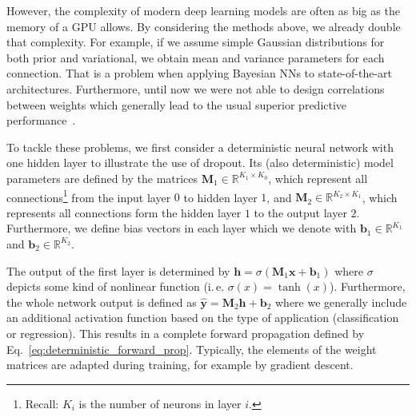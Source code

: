 \documentclass[runningheads]{llncs}
\begin{document}
However, the complexity of modern deep learning models are often as big as the memory of a GPU allows.
By considering the methods above, we already double that complexity.
For example, if we assume simple Gaussian distributions for both prior and variational, we obtain mean and variance parameters for each connection.
That is a problem when applying Bayesian NNs to state-of-the-art architectures.
Furthermore, until now we were not able to design correlations between weights which generally lead to the usual superior predictive performance~\cite{krizhevsky2012imagenet}.


To tackle these problems, we first consider a deterministic neural network with one hidden layer to illustrate the use of dropout.
Its (also deterministic) model parameters are defined by the matrices $\mathbf{M}_1 \in \mathbb{R}^{K_1\times K_0}$, which represent all connections\footnote{Recall: $K_i$ is the number of neurons in layer $i$.} from the input layer $0$ to hidden layer  $1$, and $\mathbf{M}_2 \in \mathbb{R}^{K_2\times K_1}$, which represents all connections form the hidden layer $1$ to the output layer $2$.
Furthermore, we define bias vectors in each layer which we denote with $\mathbf{b}_1 \in \mathbb{R}^{K_1}$ and $\mathbf{b}_2\in \mathbb{R}^{K_2}$.

The output of the first layer is determined by $\mathbf{h} = \sigma \left(\mathbf{M}_1\mathbf{x} + \mathbf{b}_1\right)$ where $\sigma$ depicts some kind of nonlinear function (i.\,e. $\sigma(x) = \tanh(x)$).
Furthermore, the whole network output is defined as $\hat{\mathbf{y}} = \mathbf{M}_2\mathbf{h} + \mathbf{b}_2$ where we generally include an additional activation function based on the type of application (classification or regression).
This results in a complete forward propagation defined by Eq.~\ref{eq:deterministic_forward_prop}.
Typically, the elements of the weight matrices are adapted during training, for example by gradient descent.
\end{document}
